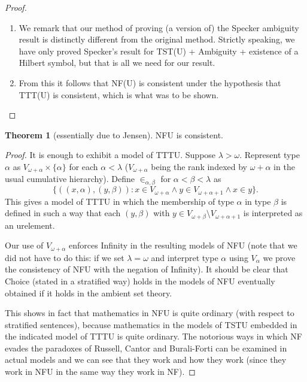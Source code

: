 \documentclass{article}
\theoremstyle{definition}
\newtheorem{theorem}{Theorem}[section]
\theoremstyle{remark}
\begin{document}
\begin{proof}
\begin{enumerate}
\item  We remark that our method of proving (a version of) the Specker ambiguity result is distinctly different from the original method.  Strictly speaking, we have only proved Specker's result for TST(U) + Ambiguity + existence of a Hilbert symbol, but that is all we need for our result.

\item From this it follows that NF(U) is consistent under the hypothesis that TTT(U) is consistent, which is what was to be shown.

\end{enumerate}
\end{proof}

\begin{theorem}[essentially due to Jensen]
  NFU is consistent.
\end{theorem}
\begin{proof}
It is enough to exhibit a model of TTTU.  Suppose $\lambda>\omega$.  Represent type $\alpha$ as $V_{\omega+\alpha} \times \{\alpha\}$ for each $\alpha<\lambda$ ($V_{\omega+\alpha}$ being the rank indexed by $\omega+\alpha$ in the usual cumulative hierarchy).  Define $\in_{\alpha,\beta}$ for
$\alpha<\beta<\lambda$ as $$\{((x,\alpha),(y,\beta)):x \in V_{\omega+\alpha} \wedge y \in V_{\omega+\alpha+1} \wedge x \in y\}.$$  This gives a model of TTTU in which the membership of
type $\alpha$ in type $\beta$ is defined in such a way that each $(y,\beta)$ with $y \in V_{\omega+\beta} \setminus V_{\omega+\alpha+1}$ is interpreted as an urelement.

Our use of $V_{\omega+\alpha}$ enforces Infinity in the resulting models of NFU (note that we did not have to do this:  if we set $\lambda=\omega$ and interpret type $\alpha$ using $V_\alpha$ we prove the consistency of NFU with the negation of Infinity).  It should be clear that Choice (stated in a stratified way) holds in the models of NFU eventually obtained if it holds in the ambient set theory.

This shows in fact that mathematics in NFU is quite ordinary (with respect to stratified sentences), because mathematics in the models of TSTU embedded in the indicated model of TTTU is quite ordinary.  The notorious ways in which NF evades the paradoxes of Russell, Cantor and Burali-Forti can be examined in actual models and we can see that they work and how they work (since they work in NFU in the same way they work in NF).
\end{proof}
\end{document}
